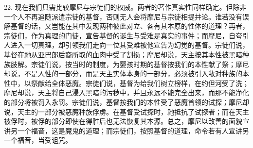 22. 现在我们只需比较摩尼与宗徒们的权威。两者的著作真实性同样确定。但除非一个人不再追随派遣宗徒的基督，否则无人会将摩尼与宗徒相提并论。谁若没有误解基督的话，又岂能在其中发现两种彼此对立、各有其本原的性体的道理？再者，宗徒们，作为真理的门徒，宣告基督的诞生与受难是真实的事件；而摩尼，自夸引人进入一切真理，却引领我们走向一位其受难被他宣告为幻觉的基督。宗徒们说，基督在祂从亚巴郎后裔所取的血肉中受了割损；摩尼却说，天主按其本性被黑暗种族肢解。宗徒们说，按当时的制度，为婴孩时期的基督按我们的本性献了祭；摩尼却说，不是人性的一部分，而是天主实体本身的一部分，必须被引入敌对种族的本性中，以祭献给全体恶魔。宗徒们说，基督为给我们树立榜样，在约但河受了洗；摩尼却说，天主将自己浸入黑暗的污秽中，并且永远不能完全出来，而那不能净化的部分将被罚入永罚。宗徒们说，基督按我们的本性受了恶魔首领的试探；摩尼却说，天主的一部分被恶魔种族俘虏。在基督受试探时，祂抵抗了试探者；而在天主被俘时，被俘的部分即使在得胜后也无法恢复其本源。总之，摩尼以改善的面貌宣讲另一个福音，这是魔鬼的道理；而宗徒们，按照基督的道理，命令若有人宣讲另一个福音，当受诅咒。\par



\section{}

\par

